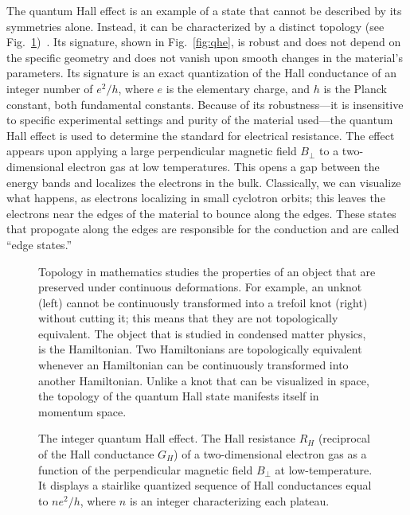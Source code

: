 The quantum Hall effect is an example of a state that cannot be described by its symmetries alone. Instead, it can be characterized by a distinct topology (see Fig.~\ref{fig:knots})~\cite{Avron2003}.
Its signature, shown in Fig.~\ref{fig:qhe}, is robust and does not depend on the specific geometry and does not vanish upon smooth changes in the material's parameters.
Its signature is an exact quantization of the Hall conductance of an integer number of $e^2/h$, where $e$ is the elementary charge, and $h$ is the Planck constant, both fundamental constants.
Because of its robustness---it is insensitive to specific experimental settings and purity of the material used---the quantum Hall effect is used to determine the standard for electrical resistance\cite{Jeckelmann2001}.
The effect appears upon applying a large perpendicular magnetic field $B_\perp$ to a two-dimensional electron gas at low temperatures.
This opens a gap between the energy bands and localizes the electrons in the bulk.
Classically, we can visualize what happens, as electrons localizing in small cyclotron orbits; this leaves the electrons near the edges of the material to bounce along the edges.
These states that propogate along the edges are responsible for the conduction and are called ``edge states.''

\begin{figure}[!htb]
\begin{center}
\caption{
Topology in mathematics studies the properties of an object that are preserved under continuous deformations.
For example, an unknot (left) cannot be continuously transformed into a trefoil knot (right) without cutting it; this means that they are not topologically equivalent.
The object that is studied in condensed matter physics, is the Hamiltonian.
Two Hamiltonians are topologically equivalent whenever an Hamiltonian can be continuously transformed into another Hamiltonian.
Unlike a knot that can be visualized in space, the topology of the quantum Hall state manifests itself in momentum space.
\label{fig:knots}}
\end{center}
\end{figure}

\begin{figure}[!htb]
\begin{center}
\caption{
The integer quantum Hall effect.
The Hall resistance $R_H$ (reciprocal of the Hall conductance $G_H$) of a two-dimensional electron gas as a function of the perpendicular magnetic field $B_\perp$ at low-temperature.
It displays a stairlike quantized sequence of Hall conductances equal to $ne^2/h$, where $n$ is an integer characterizing each plateau.
\label{fig:qhe_example}}
\end{center}
\end{figure}

